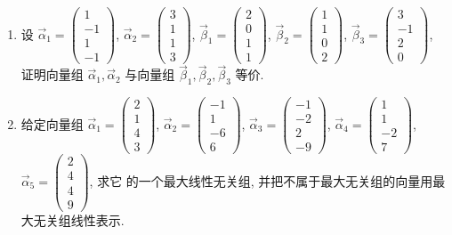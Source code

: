 \begin{enumerate}
	
	\item 设 $\vec{\alpha}_1 = \begin{pmatrix} 1 \\ -1 \\ 1 \\ -1 \end{pmatrix}$, $\vec{\alpha}_2 = \begin{pmatrix} 3 \\ 1 \\ 1 \\ 3 \end{pmatrix}$, $\vec{\beta}_1 = \begin{pmatrix} 2 \\ 0 \\ 1 \\ 1 \end{pmatrix}$, $\vec{\beta}_2 = \begin{pmatrix} 1 \\ 1 \\ 0 \\ 2 \end{pmatrix}$, $\vec{\beta}_3 = \begin{pmatrix} 3 \\ -1 \\ 2 \\ 0 \end{pmatrix}$, 证明向量组
	$\vec{\alpha}_1, \vec{\alpha}_2$ 与向量组 $\vec{\beta}_1, \vec{\beta}_2, \vec{\beta}_3$ 等价.
	
	
	\item 给定向量组 $\vec{\alpha}_1 = \begin{pmatrix} 2 \\ 1 \\ 4 \\ 3 \end{pmatrix}$, $\vec{\alpha}_2 = \begin{pmatrix} -1 \\ 1 \\ -6 \\ 6 \end{pmatrix}$, $\vec{\alpha}_3 = \begin{pmatrix} -1 \\ -2 \\ 2 \\ -9 \end{pmatrix}$, $\vec{\alpha}_4 = \begin{pmatrix} 1 \\ 1 \\ -2 \\ 7 \end{pmatrix}$, $\vec{\alpha}_5 = \begin{pmatrix} 2 \\ 4 \\ 4 \\ 9 \end{pmatrix}$, 求它
	的一个最大线性无关组, 并把不属于最大无关组的向量用最大无关组线性表示.
	

\end{enumerate}
